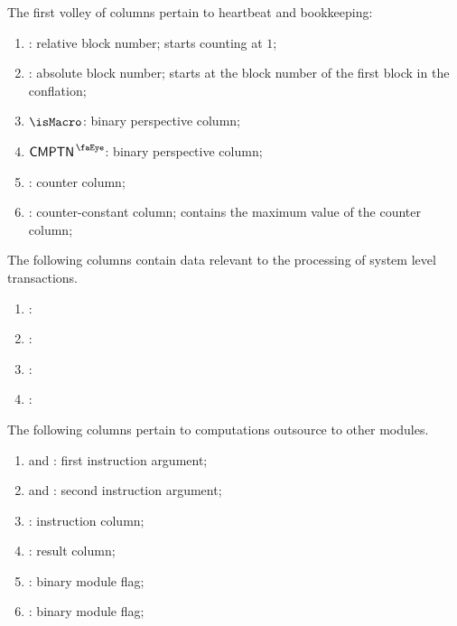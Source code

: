 The first volley of columns pertain to heartbeat and bookkeeping:
\begin{enumerate}
	\item
		\relBlock{}:
		relative block number;
		starts counting at $1$;
	\item
		\absBlock{}:
		absolute block number;
		starts at the block number of the first block in the conflation;
	\item
		$\isMacro$:
		binary perspective column;
	\item
		$\isComputation$:
		binary perspective column;
	\item
		\ct{}:
		counter column;
	\item
		\maxCt{}:
		counter-constant column;
		contains the maximum value of the counter column;
\end{enumerate}
The following columns contain data relevant to the processing of system level transactions.
\begin{enumerate}[resume]
	\item
		\godGiven{}
		\layerOneTimeStamp{}:
	\item
		\godGiven{}
		\beaconRootHi{}:
	\item
		\godGiven{}
		\beaconRootLo{}:
	\item
		\markAsJustifiedHere{}
		\layerOneTimeStampModulo{}:
\end{enumerate}
The following columns pertain to computations outsource to other modules.
\begin{enumerate}[resume]
	\item
		\computationArgOneHi{} and \computationArgOneLo{}:
		first instruction argument;
	\item
		\computationArgTwoHi{} and \computationArgTwoLo{}:
		second instruction argument;
	\item
		\computationInst:
		instruction column;
	\item
		\computationRes:
		result column;
	\item
		\computationWcpFlag:
		binary \wcpMod{} module flag;
	\item
		\computationEucFlag:
		binary \eucMod{} module flag;
\end{enumerate}
